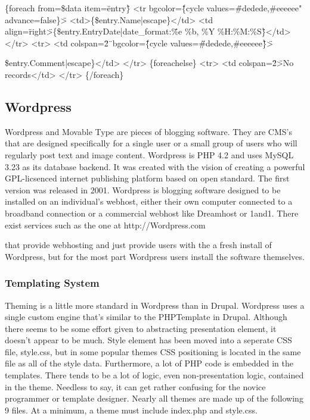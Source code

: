 \documentclass[a4paper,12pt]{report}
\begin{document}
    \{foreach from=\$data item=\"entry\"\}
        <tr bgcolor=\"\{cycle values=\"\#dedede,\#eeeeee" advance=false\}\">
            <td>\{\$entry.Name|escape\}</td>        
            <td align=\"right\">\{\$entry.EntryDate|date\_format:\"\%e \%b, \%Y \%H:\%M:\%S\"\}</td>        
        </tr>
        <tr>
            <td colspan=\"2\"\ bgcolor=\"\{cycle values=\"\#dedede,\#eeeeee\"\}\">{\$entry.Comment|escape\}</td>
        </tr>
    \{foreachelse\}
        <tr>
            <td colspan=\"2\">No records</td>
        </tr>
    \{/foreach\}


\subsection {Wordpress}
Wordpress and Movable Type are pieces of blogging software. 
They are CMS's that are designed specifically for a single user or a small group of users who will regularly post text and image content. 
Wordpress is PHP 4.2 and uses MySQL 3.23 as its database backend. 
It was created with the vision of creating a powerful GPL-licsenced internet publishing platform based on open standard. 
The first version was released in 2001. 
Wordpress is blogging software designed to be installed on an individual's webhost, either their own computer connected to a broadband connection or a commercial webhost like Dreamhost or 1and1. There exist services such as the one at http://Wordpress.com} that provide webhosting and just provide users with the a fresh install of Wordpress, but for the most part Wordpress users install the software themselves. 


\subsubsection{Templating System}
Theming is a little more standard in Wordpress than in Drupal. 
Wordpress uses a single custom engine that's similar to the PHPTemplate in Drupal. 
Although there seems to be some effort given to abstracting presentation element, it doesn't appear to be much. Style element has been moved into a seperate CSS file, style.css, but in some popular themes CSS positioning is located in the same file as all of the style data.
Furthermore, a lot of PHP code is embedded in the templates. 
There tends to be a lot of logic, even non-presentation logic, contained in the theme. Needless to say, it can get rather confusing for the novice programmer or template designer. 
Nearly all themes are made up of the following 9 files. At a minimum, a theme must include index.php and style.css. 
\end{document}
